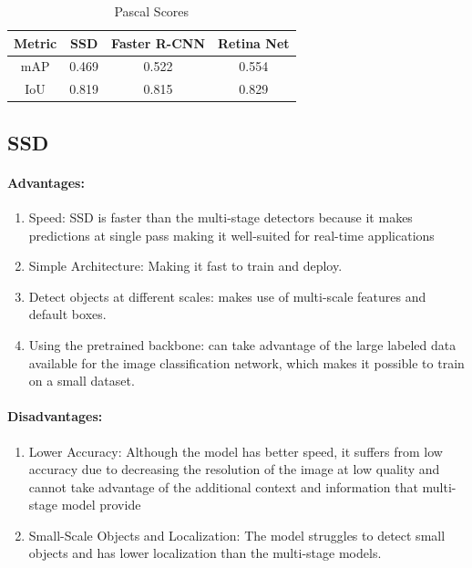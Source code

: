 \documentclass[12pt]{article}
\begin{document}
\begin{table}[h]
    \centering
    \begin{tabular}{|c|c|c|c|}
    \hline
    Metric & SSD & Faster R-CNN & Retina Net \\ \hline
    mAP & 0.469 & 0.522 & 0.554 \\ \hline
    IoU &  0.819 & 0.815 & 0.829 \\ \hline
    \end{tabular}
    \caption{Pascal Scores}
    \label{table2}
\end{table}
\subsection{SSD}
\paragraph{Advantages:}
\begin{enumerate}[leftmargin=1cm, labelwidth=4cm]
  \item Speed: SSD is faster than the multi-stage detectors because it makes predictions at single pass making it well-suited for real-time applications
  \item Simple Architecture: Making it fast to train and deploy.
  \item Detect objects at different scales: makes use of multi-scale features and default boxes.
  \item Using the pretrained backbone: can take advantage of the large labeled data available for the image classification network, which makes it possible to train on a small dataset.
\end{enumerate}

\paragraph{Disadvantages:}
\begin{enumerate}[leftmargin=1cm, labelwidth=4cm]
  \item Lower Accuracy: Although the model has better speed, it suffers from low accuracy due to decreasing the resolution of the image at low quality and cannot take advantage of the additional context and information that multi-stage model provide
  \item Small-Scale Objects and Localization: The model struggles to detect small objects and has lower localization than the multi-stage models.
\end{enumerate}
\end{document}
